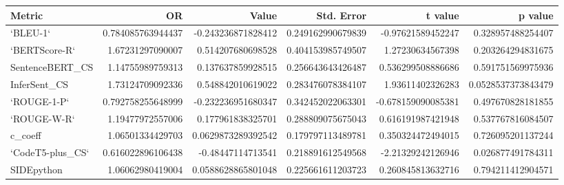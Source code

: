 \begin{tabular}{lrrrrr}
\hline
Metric & OR & Value & Std. Error & t value & p value
\\
\hline
`BLEU-1` & 0.784085763944437 & -0.243236871828412 & 0.249162990679839 & -0.97621589452247 & 0.328957488254407
\\
`BERTScore-R` & 1.67231297090007 & 0.514207680698528 & 0.404153985749507 & 1.27230634567398 & 0.203264294831675
\\
SentenceBERT\_CS & 1.14755989759313 & 0.137637859928515 & 0.256643643426487 & 0.536299508886686 & 0.591751569975936
\\
InferSent\_CS & 1.73124709092336 & 0.548842010619022 & 0.283476078384107 & 1.93611402326283 & 0.0528537373843479
\\
`ROUGE-1-P` & 0.792758255648999 & -0.232236951680347 & 0.342452022063301 & -0.678159090085381 & 0.497670828181855
\\
`ROUGE-W-R` & 1.19477972557006 & 0.177961838325701 & 0.288809075675043 & 0.616191987421948 & 0.537767816084507
\\
c\_coeff & 1.06501334429703 & 0.0629873289392542 & 0.179797113489781 & 0.350324472494015 & 0.726095201137244
\\
`CodeT5-plus\_CS` & 0.616022896106438 & -0.48447114713541 & 0.218891612549568 & -2.21329242126946 & 0.026877491784311
\\
SIDEpython & 1.06062980419004 & 0.0588628865801048 & 0.225661611203723 & 0.260845813632716 & 0.794211412904571
\\
\hline
\end{tabular}
